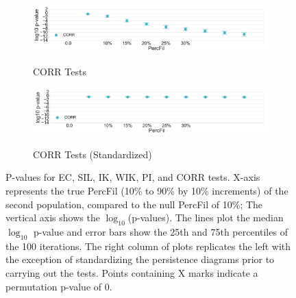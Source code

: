 \documentclass[12pt]{article}
\begin{document}
\begin{description}
\begin{center}
\begin{figure}[htp!]
\begin{subfigure}{.48\textwidth}
        \label{fig:all_weight_normed}
      \end{subfigure}
      \begin{subfigure}{.48\textwidth}
        \caption{CORR Tests}
        \includegraphics[width=\linewidth, height = .75in]{figure_8_all_correlation_group.pdf}
        \label{fig:all_corr}
      \end{subfigure}
      \begin{subfigure}{.48\textwidth}
        \caption{CORR Tests (Standardized)}
        \includegraphics[width=\linewidth, height = .75in]{figure_8_all_correlation_group_normed.pdf}
        \label{fig:all_corr_normed}
      \end{subfigure}
      \caption{P-values for EC, SIL, IK, WIK, PI, and CORR tests. X-axis represents the true PercFil (10\% to 90\% by 10\% increments) of the second population, compared to the null PercFil of 10\%;
      The vertical axis shows the $\log_{10}$(p-values). The lines plot the median $\log_{10}$ p-value and error bars show the 25th and 75th percentiles of the 100 iterations.
 The right column of plots replicates the left with the exception of standardizing the persistence diagrams prior to carrying out the tests.    Points containing X marks indicate a permutation p-value of 0.
      }
      \label{fig:linesUnnormApp}
    \end{figure}
  \end{center}
\end{description}




\end{document}
